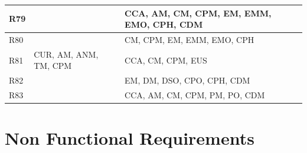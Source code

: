 \documentclass{Configuration_Files/PoliMi3i_thesis}
\begin{document}
\begin{xltabular}{\textwidth}{| >{}l | X | X |}
R79 & & CCA, AM, CM, CPM, EM, EMM, EMO, CPH, CDM \B\\
\hline

R80 & & CM, CPM, EM, EMM, EMO, CPH \B\\
\hline

R81 & CUR, AM, ANM, TM, CPM & CCA, CM, CPM, EUS \B\\
\hline

R82 & & EM, DM, DSO, CPO, CPH, CDM \B\\
\hline

R83 & & CCA, AM, CM, CPM, PM, PO, CDM \B\\
\hline
\end{xltabular}

\section{Non Functional Requirements}
\end{document}
